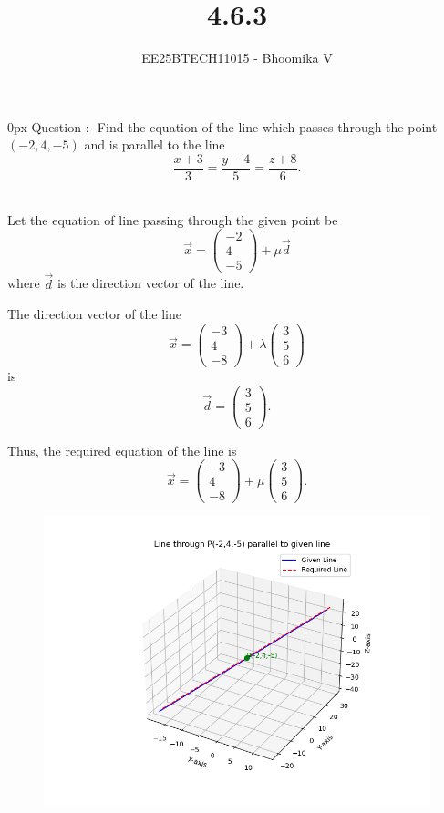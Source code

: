 \documentclass[journal]{IEEEtran}
\begin{document}

\vspace{3cm}

\title{4.6.3}
\author{EE25BTECH11015 - Bhoomika V}
{\let\newpage\relax\maketitle}

\renewcommand{\thefigure}{\theenumi}
\renewcommand{\thetable}{\theenumi}
\setlength{\intextsep}{10pt} %


\renewcommand{\thetable}{\theenumi}
\parindent 0px 
{Question :-} 
Find the equation of the line which passes through the point $(-2,4,-5)$ and is parallel to the line
\[
\frac{x+3}{3} = \frac{y-4}{5} = \frac{z+8}{6}.
\]

\solution \\ 

Let the equation of line passing through the given point be
\[
\vec{x} = 
\begin{pmatrix}
-2 \\ 4 \\ -5
\end{pmatrix}
+ \mu \vec{d}
\]
where $\vec{d}$ is the direction vector of the line.  

The direction vector of the line 
\[
\vec{x} = 
\begin{pmatrix}
-3 \\ 4 \\ -8
\end{pmatrix}
+ \lambda
\begin{pmatrix}
3 \\ 5 \\ 6
\end{pmatrix}
\]
is
\[
\vec{d} = 
\begin{pmatrix}
3 \\ 5 \\ 6
\end{pmatrix}.
\tag{1}
\]

Thus, the required equation of the line is
\[
\vec{x} =
\begin{pmatrix}
-3 \\ 4 \\ -8
\end{pmatrix}
+ \mu 
\begin{pmatrix}
3 \\ 5 \\ 6
\end{pmatrix}.
\]
\begin{figure}[H]
\begin{center}
\includegraphics[width=0.6\columnwidth]{Figs/Fig1.png}
\end{center}
\caption{}
\label{fig:Fig.1}
\end{figure}
\end{document}
